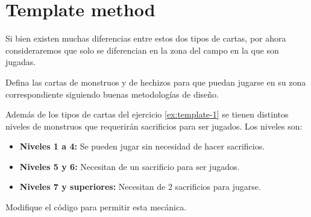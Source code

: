 \section{Template method}
  \begin{Exercise}[title={Zonas de juego}, label={ex:template-1}]
    Si bien existen muchas diferencias entre estos dos tipos de cartas, por ahora 
    consideraremos que solo se diferencian en la zona del campo en la que son jugadas.

    Defina las cartas de monstruos y de hechizos para que puedan jugarse en su zona 
    correspondiente siguiendo buenas metodologías de diseño.
  \end{Exercise}

  \begin{Exercise}[title={Niveles de monstruos}, label={ex:template-2}]
    Además de los tipos de cartas del ejercicio \ref{ex:template-1} se tienen distintos 
    niveles de monstruos que requerirán sacrificios para ser jugados.
    Los niveles son:
    \begin{itemize}
      \item \textbf{Niveles 1 a 4:} Se pueden jugar sin necesidad de hacer sacrificios.
      \item \textbf{Niveles 5 y 6:} Necesitan de un sacrificio para ser jugados.
      \item \textbf{Niveles 7 y superiores:} Necesitan de 2 sacrificios para jugarse.  
    \end{itemize}

    Modifique el código para permitir esta mecánica.
  \end{Exercise}

